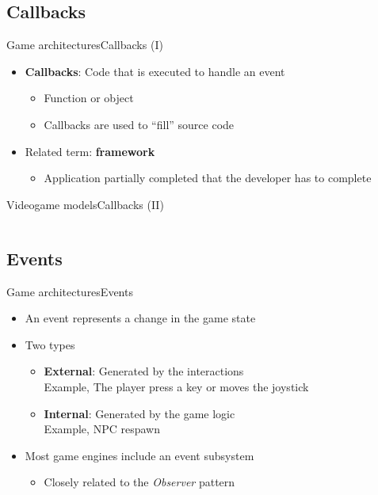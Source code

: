 \documentclass[10pt,compress]{beamer} %
\begin{document}
\subsection{Callbacks}
\begin{frame}{Game architectures}{Callbacks (I)}
	\begin{itemize}
		\item \textbf{Callbacks}: Code that is executed to handle an event
		\begin{itemize}
			\item Function or object
			\item Callbacks are used to ``fill'' source code
		\end{itemize}
		\item Related term: \textbf{framework}
		\begin{itemize}
			\item Application partially completed that the developer has to complete
		\end{itemize}
	\end{itemize}
\end{frame}

\begin{frame}{Videogame models}{Callbacks (II)}
	\vspace{-0.3cm}
    \begin{columns}
    		\begin{block}{}
	    	\vspace{-0.2cm}
	    	
			\vspace{-0.2cm}
			\end{block}
	\end{columns}
\end{frame}

\subsection{Events}
\begin{frame}{Game architectures}{Events}
	\begin{itemize}
		\item An event represents a change in the game state
		\item Two types
		\begin{itemize}
			\item \textbf{External}: Generated by the interactions\\Example, The player press a key or moves the joystick
			\item \textbf{Internal}: Generated by the game logic\\Example, NPC respawn
		\end{itemize}
		\item Most game engines include an event subsystem
		\begin{itemize}
			\item Closely related to the \textit{Observer} pattern
		\end{itemize}

	\end{itemize}
\end{frame}
\end{document}

